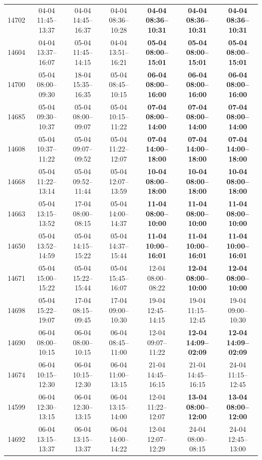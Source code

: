 \begin{table}[htbp]
\begin{tabular}{|r|c|c|c|c|c|c|}
14702 & 04-04 11:45--13:37 & 04-04 14:45--16:37 & 04-04 08:36--10:28 & \textbf{04-04 08:36--10:31} & \textbf{04-04 08:36--10:31} & \textbf{04-04 08:36--10:31} \\ 
14604 & 04-04 13:37--16:07 & 05-04 11:45--14:15 & 04-04 13:51--16:21 & \textbf{05-04 08:00--15:01} & \textbf{05-04 08:00--15:01} & \textbf{05-04 08:00--15:01} \\ 
14700 & 05-04 08:00--09:30 & 18-04 15:35--16:35 & 05-04 08:45--10:15 & \textbf{06-04 08:00--16:00} & \textbf{06-04 08:00--16:00} & \textbf{06-04 08:00--16:00} \\ 
14685 & 05-04 09:30--10:37 & 05-04 08:00--09:07 & 05-04 10:15--11:22 & \textbf{07-04 08:00--14:00} & \textbf{07-04 08:00--14:00} & \textbf{07-04 08:00--14:00} \\ 
14608 & 05-04 10:37--11:22 & 05-04 09:07--09:52 & 05-04 11:22--12:07 & \textbf{07-04 14:00--18:00} & \textbf{07-04 14:00--18:00} & \textbf{07-04 14:00--18:00} \\ 
14668 & 05-04 11:22--13:14 & 05-04 09:52--11:44 & 05-04 12:07--13:59 & \textbf{10-04 08:00--18:00} & \textbf{10-04 08:00--18:00} & \textbf{10-04 08:00--18:00} \\ 
14663 & 05-04 13:15--13:52 & 17-04 08:00--08:15 & 05-04 14:00--14:37 & \textbf{11-04 08:00--10:00} & \textbf{11-04 08:00--10:00} & \textbf{11-04 08:00--10:00} \\ 
14650 & 05-04 13:52--14:59 & 05-04 14:15--15:22 & 05-04 14:37--15:44 & \textbf{11-04 10:00--16:01} & \textbf{11-04 10:00--16:01} & \textbf{11-04 10:00--16:01} \\ 
14671 & 05-04 15:00--15:22 & 05-04 15:22--15:44 & 05-04 15:45--16:07 & 12-04 08:00--08:22 & \textbf{12-04 08:00--10:00} & \textbf{12-04 08:00--10:00} \\ 
14698 & 05-04 15:22--19:07 & 17-04 08:15--09:45 & 17-04 09:00--10:30 & 19-04 12:45--14:15 & 19-04 11:15--12:45 & 19-04 09:00--10:30 \\ 
14690 & 06-04 08:00--10:15 & 06-04 08:00--10:15 & 06-04 08:45--11:00 & 12-04 09:07--11:22 & \textbf{12-04 14:09--02:09} & \textbf{12-04 14:09--02:09} \\ 
14674 & 06-04 10:15--12:30 & 06-04 10:15--12:30 & 06-04 11:00--13:15 & 21-04 14:45--16:15 & 21-04 14:45--16:15 & 24-04 11:15--12:45 \\ 
14599 & 06-04 12:30--13:15 & 06-04 12:30--13:15 & 06-04 13:15--14:00 & 12-04 11:22--12:07 & \textbf{13-04 08:00--12:00} & \textbf{13-04 08:00--12:00} \\ 
14692 & 06-04 13:15--13:37 & 06-04 13:15--13:37 & 06-04 14:00--14:22 & 12-04 12:07--12:29 & 24-04 08:00--08:15 & 24-04 12:45--13:00 \\ 

\end{tabular}
\end{table}
